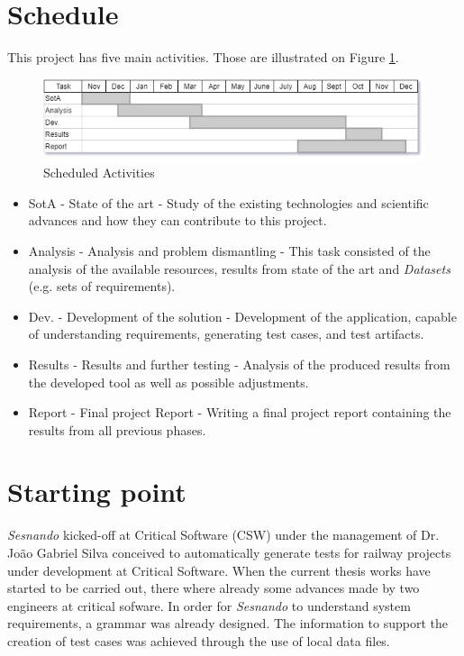 \section{Schedule}
\label{sec:schedule}
This project has five main activities. Those are illustrated on Figure \ref{fig:schedule}.

\begin{figure}[h]
    \centering
    \includegraphics[width=\textwidth]{images/gantt.jpg}
    \caption{Scheduled Activities}
    \label{fig:schedule}
\end{figure}

\begin{itemize}
    \item SotA - State of the art - Study of the existing technologies and scientific advances and how they can contribute to this project.
    \item Analysis - Analysis and problem dismantling - This task consisted of the analysis of the available resources, results from state of the art and \textit{Datasets} (e.g. sets of requirements).
    \item Dev. - Development of the solution - Development of the application, capable of understanding requirements, generating test cases, and test artifacts.
    \item Results - Results and further testing - Analysis of the produced results from the developed tool as well as possible adjustments.
    \item Report - Final project Report - Writing a final project report containing the results from all previous phases.
\end{itemize}

\newpage
\section{Starting point}
\label{sec:starting_point}


\textit{Sesnando} kicked-off at Critical Software (CSW) under the management of Dr. João Gabriel Silva conceived to automatically generate tests for railway projects under development at Critical Software. When the current thesis works have started to be carried out, there where already some advances made by two engineers at critical sofware. In order for \textit{Sesnando} to understand system requirements, a grammar was already designed. The information to support the creation of test cases was achieved through the use of local data files.\\

